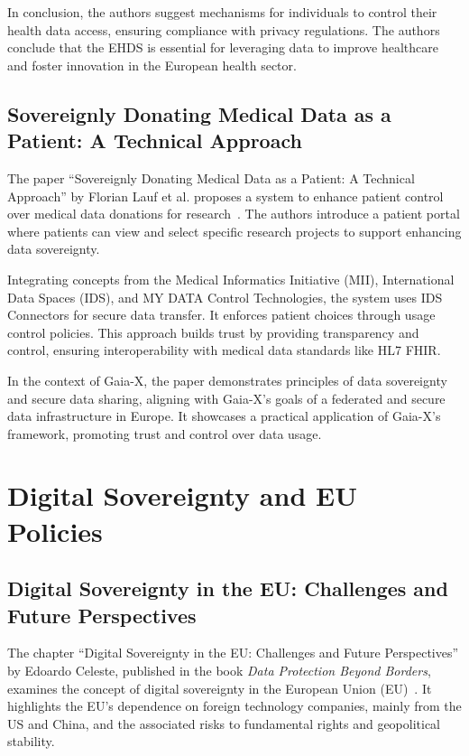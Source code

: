In conclusion, the authors suggest mechanisms for individuals to control their health data access, ensuring compliance with privacy regulations.
The authors conclude that the EHDS is essential for leveraging data to improve healthcare and foster innovation in the European health sector.

\subsection{Sovereignly Donating Medical Data as a Patient: A Technical Approach}\label{subsec:sovereignly-donating-medical-data-as-a-patient:-a-technical-approach}

The paper ``Sovereignly Donating Medical Data as a Patient: A Technical Approach'' by Florian Lauf et al. proposes a system to enhance patient control over medical data donations for research~\cite{sovereignly_donating_medical_data}.
The authors introduce a patient portal where patients can view and select specific research projects to support enhancing data sovereignty.

Integrating concepts from the Medical Informatics Initiative (MII), International Data Spaces (IDS), and MY DATA Control Technologies, the system uses IDS Connectors for secure data transfer.
It enforces patient choices through usage control policies.
This approach builds trust by providing transparency and control, ensuring interoperability with medical data standards like HL7 FHIR.

In the context of Gaia-X, the paper demonstrates principles of data sovereignty and secure data sharing, aligning with Gaia-X's goals of a federated and secure data infrastructure in Europe.
It showcases a practical application of Gaia-X's framework, promoting trust and control over data usage.

\section{Digital Sovereignty and EU Policies}\label{sec:digital-sovereignty-and-eu-policies}

\subsection{Digital Sovereignty in the EU: Challenges and Future Perspectives}\label{subsec:digital-sovereignty-in-the-eu:-challenges-and-future-perspectives}

The chapter ``Digital Sovereignty in the EU: Challenges and Future Perspectives'' by Edoardo Celeste, published in the book \textit{Data Protection Beyond Borders}, examines the concept of digital sovereignty in the European Union (EU)~\cite{dig_sovereignty_challenges}.
It highlights the EU's dependence on foreign technology companies, mainly from the US and China, and the associated risks to fundamental rights and geopolitical stability.


